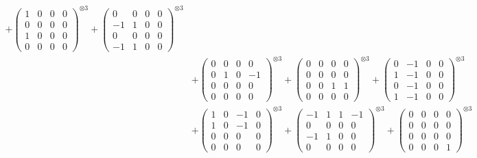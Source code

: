 \documentclass{article}
\begin{document}
{\begin{align}
            + \begin{pmatrix} 1 & 0 & 0 & 0 \\ 0 & 0 & 0 & 0 \\ 1 & 0 & 0 & 0 \\ 0 & 0 & 0 & 0 \end{pmatrix}^{\otimes 3} 
            + \begin{pmatrix} 0 & 0 & 0 & 0 \\ -1 & 1 & 0 & 0 \\ 0 & 0 & 0 & 0 \\ -1 & 1 & 0 & 0 \end{pmatrix}^{\otimes 3} \\
        &+ \label{Rs16-Rc11-Solution-2-c10} \begin{pmatrix} 0 & 0 & 0 & 0 \\ 0 & 1 & 0 & -1 \\ 0 & 0 & 0 & 0 \\ 0 & 0 & 0 & 0 \end{pmatrix}^{\otimes 3} 
            + \begin{pmatrix} 0 & 0 & 0 & 0 \\ 0 & 0 & 0 & 0 \\ 0 & 0 & 1 & 1 \\ 0 & 0 & 0 & 0 \end{pmatrix}^{\otimes 3} 
            + \begin{pmatrix} 0 & -1 & 0 & 0 \\ 1 & -1 & 0 & 0 \\ 0 & -1 & 0 & 0 \\ 1 & -1 & 0 & 0 \end{pmatrix}^{\otimes 3} \\
        &+ \label{Rs16-Rc11-Solution-2-c13} \begin{pmatrix} 1 & 0 & -1 & 0 \\ 1 & 0 & -1 & 0 \\ 0 & 0 & 0 & 0 \\ 0 & 0 & 0 & 0 \end{pmatrix}^{\otimes 3} 
            + \begin{pmatrix} -1 & 1 & 1 & -1 \\ 0 & 0 & 0 & 0 \\ -1 & 1 & 0 & 0 \\ 0 & 0 & 0 & 0 \end{pmatrix}^{\otimes 3} 
            + \begin{pmatrix} 0 & 0 & 0 & 0 \\ 0 & 0 & 0 & 0 \\ 0 & 0 & 0 & 0 \\ 0 & 0 & 0 & 1 \end{pmatrix}^{\otimes 3} \\

\end{align}}
\end{document}
